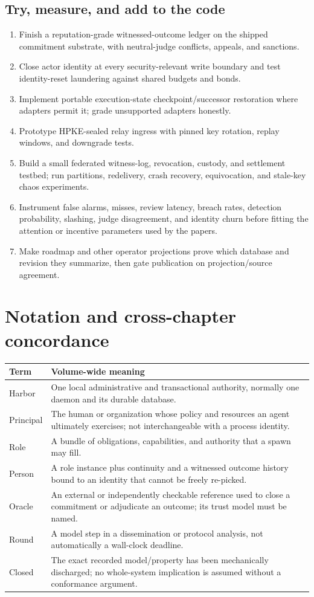\subsection{Try, measure, and add to the code}
\begin{enumerate}[leftmargin=*]
\item Finish a reputation-grade witnessed-outcome ledger on the shipped
commitment substrate, with neutral-judge conflicts, appeals, and sanctions.
\item Close actor identity at every security-relevant write boundary and test
identity-reset laundering against shared budgets and bonds.
\item Implement portable execution-state checkpoint/successor restoration where
adapters permit it; grade unsupported adapters honestly.
\item Prototype HPKE-sealed relay ingress with pinned key rotation, replay
windows, and downgrade tests.
\item Build a small federated witness-log, revocation, custody, and settlement
testbed; run partitions, redelivery, crash recovery, equivocation, and stale-key
chaos experiments.
\item Instrument false alarms, misses, review latency, breach rates, detection
probability, slashing, judge disagreement, and identity churn before fitting the
attention or incentive parameters used by the papers.
\item Make roadmap and other operator projections prove which database and
revision they summarize, then gate publication on projection/source agreement.
\end{enumerate}

\section{Notation and cross-chapter concordance}
\begin{tabularx}{\textwidth}{@{}p{}X@{}}
\toprule
\textbf{Term} & \textbf{Volume-wide meaning}\\
\midrule
Harbor & One local administrative and transactional authority, normally one daemon and its durable database.\\
Principal & The human or organization whose policy and resources an agent ultimately exercises; not interchangeable with a process identity.\\
Role & A bundle of obligations, capabilities, and authority that a spawn may fill.\\
Person & A role instance plus continuity and a witnessed outcome history bound to an identity that cannot be freely re-picked.\\
Oracle & An external or independently checkable reference used to close a commitment or adjudicate an outcome; its trust model must be named.\\
Round & A model step in a dissemination or protocol analysis, not automatically a wall-clock deadline.\\
Closed & The exact recorded model/property has been mechanically discharged; no whole-system implication is assumed without a conformance argument.\\
\bottomrule
\end{tabularx}

